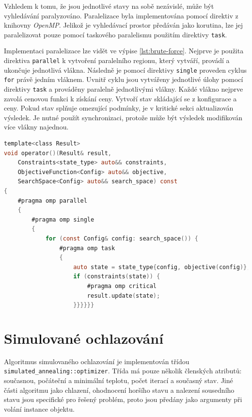 Vzhledem k tomu, že jsou jednotlivé stavy na sobě nezávislé, může být vyhledávání paralyzováno.
Paralelizace byla implementována pomocí direktiv z knihovny \textit{OpenMP}.
Jelikož je vyhledávací prostor předáván jako korutina, lze jej paralelizovat pouze pomocí taskového paralelismu použitím direktivy \texttt{task}.

Implementaci paralelizace lze vidět ve výpise \ref{lst:brute-force}.
Nejprve je použita direktiva \texttt{parallel} k vytvoření paralelního regionu, který vytváří, provádí a ukončuje jednotlivá vlákna.
Následně je pomocí direktivy \texttt{single} proveden cyklus \texttt{for} právě jedním vláknem.
Uvnitř cyklu jsou vytvářeny jednotlivé úlohy pomocí direktivy \texttt{task} a prováděny paralelně jednotlivými vlákny.
Každé vlákno nejprve zavolá cenovou funkci k získání ceny.
Vytvoří stav skládající se z konfigurace a ceny.
Pokud stav splňuje omezující podmínky, je v kritické sekci aktualizován výsledek.
Je nutné použít synchronizaci, protože může být výsledek modifikován více vlákny najednou.

\begin{lstlisting}[caption={~Optimalizace pomocí algoritmu hrubé síly},label={lst:brute-force},captionpos=t,abovecaptionskip=-\medskipamount,belowcaptionskip=\medskipamount,language=C]
template<class Result>
void operator()(Result& result,
    Constraints<state_type> auto&& constraints,
    ObjectiveFunction<Config> auto&& objective,
    SearchSpace<Config> auto&& search_space) const
{
    #pragma omp parallel
    {
        #pragma omp single
        {
            for (const Config& config: search_space()) {
                #pragma omp task
                {
                    auto state = state_type{config, objective(config)};
                    if (constraints(state)) {
                        #pragma omp critical
                        result.update(state);
                    }}}}}}
\end{lstlisting}

\section{Simulované ochlazování}
Algoritmus simulovaného ochlazování je implementován třídou \texttt{simulated\_annealing::optimizer}.
Třída má pouze několik členských atributů: současnou, počáteční a minimální teplotu, počet iterací a současný stav.
Jiné části algoritmu jako chlazení, ohodnocení horšího stavu a nalezení sousedního stavu jsou specifické pro řešený problém, proto jsou předány jako argumenty při volání instance objektu.


